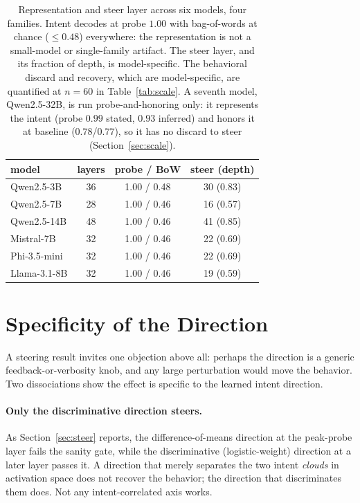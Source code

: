 \documentclass[11pt]{article}
\begin{document}
\begin{table}[t]
\centering\small
\begin{tabular}{lccc}
\toprule
model & layers & probe / BoW & steer (depth) \\
\midrule
Qwen2.5-3B  & 36 & 1.00 / 0.48 & 30 (0.83) \\
Qwen2.5-7B  & 28 & 1.00 / 0.46 & 16 (0.57) \\
Qwen2.5-14B & 48 & 1.00 / 0.46 & 41 (0.85) \\
Mistral-7B  & 32 & 1.00 / 0.46 & 22 (0.69) \\
Phi-3.5-mini & 32 & 1.00 / 0.46 & 22 (0.69) \\
Llama-3.1-8B & 32 & 1.00 / 0.46 & 19 (0.59) \\
\bottomrule
\end{tabular}
\caption{Representation and steer layer across six models, four families. Intent decodes at probe $1.00$ with
bag-of-words at chance ($\le 0.48$) everywhere: the representation is not a small-model or single-family
artifact. The steer layer, and its fraction of depth, is model-specific. The behavioral discard and recovery,
which are model-specific, are quantified at $n{=}60$ in Table~\ref{tab:scale}. A seventh model, Qwen2.5-32B,
is run probe-and-honoring only: it represents the intent (probe $0.99$ stated, $0.93$ inferred) and honors it
at baseline ($0.78$/$0.77$), so it has no discard to steer (Section~\ref{sec:scale}).}
\label{tab:general}
\end{table}

\section{Specificity of the Direction}
\label{sec:spec}
A steering result invites one objection above all: perhaps the direction is a generic feedback-or-verbosity
knob, and any large perturbation would move the behavior. Two dissociations show the effect is specific to the
learned intent direction.

\paragraph{Only the discriminative direction steers.} As Section~\ref{sec:steer} reports, the
difference-of-means direction at the peak-probe layer fails the sanity gate, while the discriminative
(logistic-weight) direction at a later layer passes it. A direction that merely separates the two intent
\emph{clouds} in activation space does not recover the behavior; the direction that discriminates them does.
Not any intent-correlated axis works.
\end{document}
